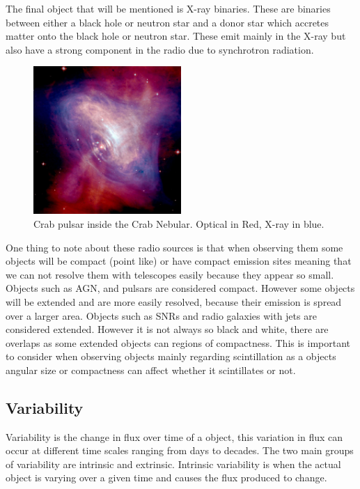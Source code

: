 \documentclass[a4paper, 10pt]{article}
\begin{document}
The final object that will be mentioned is X-ray binaries. These are binaries between either a black hole or neutron star and a donor star which accretes matter onto the black hole or neutron star. These emit mainly in the X-ray but also have a strong component in the radio due to synchrotron radiation.
\begin{figure}[H]
\begin{center}
	\includegraphics[width=0.5\textwidth]{pulsar}
	\caption{Crab pulsar inside the Crab Nebular. Optical in Red, X-ray in blue\footnotemark.}
	\label{pulsar}
\end{center}
\end{figure}
One thing to note about these radio sources is that when observing them some objects will be compact (point like) or have compact emission sites meaning that we can not resolve them with telescopes easily because they appear so small. Objects such as AGN, and pulsars are considered compact. 
However some objects will be extended and are more easily resolved, because their emission is spread over a larger area. Objects such as SNRs and radio galaxies with jets are considered extended. However it is not always so black and white, there are overlaps as some extended objects can regions of compactness. This is important to consider when observing objects mainly regarding scintillation as a objects angular size or compactness can affect whether it scintillates or not.

\subsection{Variability}
Variability is the change in flux over time of a object, this variation in flux can occur at different time scales ranging from days to decades. The two main groups of variability are intrinsic and extrinsic. Intrinsic variability is when the actual object is varying over a given time and causes the flux produced to change.\\
\end{document}
